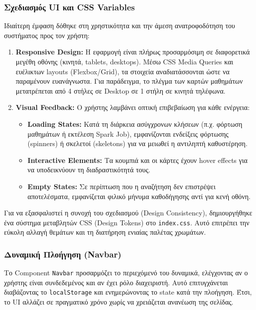 \documentclass[a4paper,12pt]{article}
\begin{document}
\subsubsection{Σχεδιασμός UI και CSS Variables}

Ιδιαίτερη έμφαση δόθηκε στη χρηστικότητα και την άμεση ανατροφοδότηση του συστήματος προς τον χρήστη:

\begin{enumerate}
    \item \textbf{Responsive Design:} Η εφαρμογή είναι πλήρως προσαρμόσιμη σε διαφορετικά μεγέθη οθόνης (κινητά, tablets, desktops). Μέσω CSS Media Queries και ευέλικτων layouts (Flexbox/Grid), τα στοιχεία αναδιατάσσονται ώστε να παραμένουν ευανάγνωστα. Για παράδειγμα, το πλέγμα των καρτών μαθημάτων μετατρέπεται από 4 στήλες σε Desktop σε 1 στήλη σε κινητά τηλέφωνα.
    
    \item \textbf{Visual Feedback:} Ο χρήστης λαμβάνει οπτική επιβεβαίωση για κάθε ενέργεια:
    \begin{itemize}
        \item \textbf{Loading States:} Κατά τη διάρκεια ασύγχρονων κλήσεων (π.χ. φόρτωση μαθημάτων ή εκτέλεση Spark Job), εμφανίζονται ενδείξεις φόρτωσης (spinners) ή σκελετοί (skeletons) για να μειωθεί η αντιληπτή καθυστέρηση.
        \item \textbf{Interactive Elements:} Τα κουμπιά και οι κάρτες έχουν hover effects για να υποδεικνύουν τη διαδραστικότητά τους.
        \item \textbf{Empty States:} Σε περίπτωση που η αναζήτηση δεν επιστρέψει αποτελέσματα, εμφανίζεται φιλικό μήνυμα καθοδήγησης αντί για κενή οθόνη.
    \end{itemize}
\end{enumerate}

Για να εξασφαλιστεί η συνοχή του σχεδιασμού (Design Consistency), δημιουργήθηκε ένα σύστημα μεταβλητών CSS (Design Tokens) στο \texttt{index.css}. Αυτό επιτρέπει την εύκολη αλλαγή θεμάτων και τη διατήρηση ενιαίας παλέτας χρωμάτων.

\subsubsection{Δυναμική Πλοήγηση (Navbar)}
Το Component \texttt{Navbar} προσαρμόζει το περιεχόμενό του δυναμικά, ελέγχοντας αν ο χρήστης είναι συνδεδεμένος και αν έχει ρόλο διαχειριστή. Αυτό επιτυγχάνεται διαβάζοντας το \texttt{localStorage} και ενημερώνοντας το state κατά την πλοήγηση. Έτσι, το UI αλλάζει σε πραγματικό χρόνο χωρίς να χρειάζεται ανανέωση της σελίδας.
\end{document}
